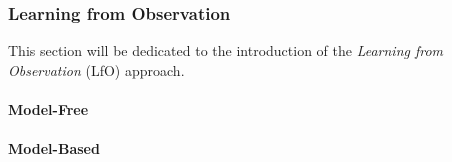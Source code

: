 \subsubsection{Learning from Observation}
\label{sec:lfo}
This section will be dedicated to the introduction of the \textit{Learning from Observation} (LfO) approach. 
\paragraph{Model-Free}
\paragraph{Model-Based}